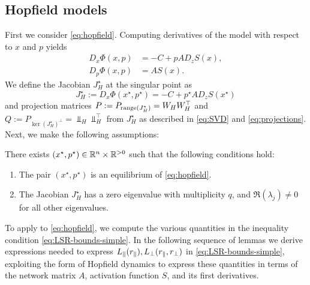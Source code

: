 \documentclass[letterpaper, 10 pt, conference]{ieeeconf}
\begin{document}
\subsection{Hopfield models}
\label{subsec:hopfield}

First we consider \eqref{eq:hopfield}. Computing derivatives of the model with respect to \(x\) and \(p\) yields
\begin{subequations}
    \begin{align}
        D_{x}\Phi(x,p) & = -C + pAD_{z}S(x), \label{eq:hopfield-D_x} \\
        D_{p}\Phi(x,p) & = AS(x). \label{eq:hopfield-D_p}
    \end{align} \label{eq:hopfield-jacobians}
\end{subequations}
We define the Jacobian \(J^{\star}_H\) at the singular point as
\begin{equation*}
    J^{\star}_H := D_{x}\Phi(x^{\star},p^{\star}) = -C + p^{\star} A D_{z}S(x^{\star})
\end{equation*}
and projection matrices \(P:=P_{\range(J^{\star}_H)}=W_H W_H^{\top}\) and \(Q:=P_{\ker(J^{\star}_H)^{\perp}}=\Vbar_H \Vbar_H^{\top}\) from \(J^{\star}_H\) as described in \eqref{eq:SVD} and \eqref{eq:projections}. Next, we make the following assumptions:
\begin{assumption}\label{asmp:hopfield}
    There exists \((x^{\star},p^{\star}) \in \R[n] \times \R[>0]\) such that the following conditions hold:
    \begin{enumerate}[label=(\roman*)]
        \item The pair \((x^{\star},p^{\star})\) is an equilibrium of \eqref{eq:hopfield}.
        \item The Jacobian \(J^{\star}_H\) has a zero eigenvalue with multiplicity \(q\), and \(\Re(\lambda_{j}) \neq 0\) for all other eigenvalues.
    \end{enumerate}
\end{assumption}
To apply  to \eqref{eq:hopfield}, we compute the various quantities in the inequality condition \eqref{eq:LSR-bounds-simple}.
In the following sequence of lemmas we derive expressions needed to express \(\Lpr,\Lpp\) in \eqref{eq:LSR-bounds-simple}, exploiting the form of Hopfield dynamics to express these quantities in terms of the network matrix \(A\), activation function \(S\), and its first derivatives.

\vspace{3mm}
\end{document}
